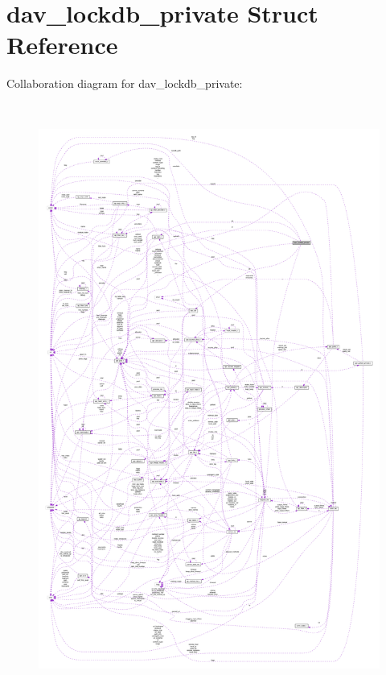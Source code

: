 \hypertarget{structdav__lockdb__private}{}\section{dav\+\_\+lockdb\+\_\+private Struct Reference}
\label{structdav__lockdb__private}


Collaboration diagram for dav\+\_\+lockdb\+\_\+private\+:
\nopagebreak
\begin{figure}[H]
\begin{center}
\leavevmode
\includegraphics[height=550pt]{structdav__lockdb__private__coll__graph}
\end{center}
\end{figure}
